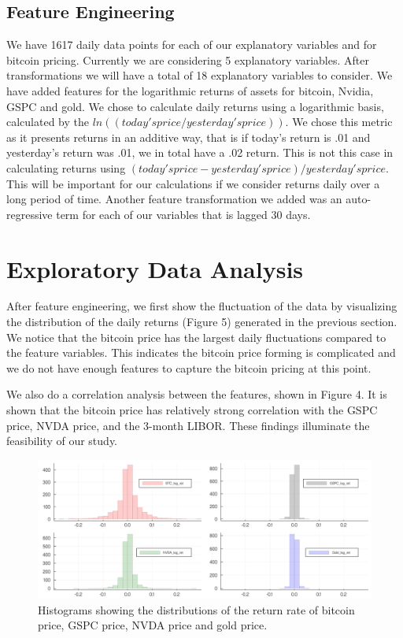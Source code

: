 \documentclass[9pt,twocolumn,twoside]{ilcss}
\begin{document}
\subsection*{Feature Engineering}
We have 1617 daily data points for each of our explanatory variables and for bitcoin pricing. Currently we are considering 5 explanatory variables. After transformations we will have a total of 18 explanatory variables to consider.
We have added features for the logarithmic returns of assets for bitcoin, Nvidia, GSPC and gold. We chose to calculate daily returns using a logarithmic basis, calculated by the $ln((today's price / yesterday's price))$. We chose this metric as it presents returns in an additive way, that is if today's return is .01 and yesterday's return was .01, we in total have a .02 return. This is not this case in calculating returns using $(today's price - yesterday's price) / yesterday's price$. This will be important for our calculations if we consider returns daily over a long period of time. Another feature transformation we added was an auto-regressive term for each of our variables that is lagged 30 days. 

\section{Exploratory Data Analysis}
After feature engineering, we first show the fluctuation of the data by visualizing the distribution of the daily returns (Figure 5) generated in the previous section. We notice that the bitcoin price has the largest daily fluctuations compared to the feature variables. This indicates the bitcoin price forming is complicated and we do not have enough features to capture the bitcoin pricing at this point.

We also do a correlation analysis between the features, shown in Figure 4. It is shown that the bitcoin price has relatively strong correlation with the GSPC price, NVDA price, and the 3-month LIBOR. These findings illuminate the feasibility of our study. 

\begin{figure}[tbhp]
\centering
\includegraphics[width=0.9\linewidth]{return_hists.png}
\caption{Histograms showing the distributions of the return rate of bitcoin price, GSPC price, NVDA price and gold price.}
\label{fig:4}
\end{figure}
\end{document}
